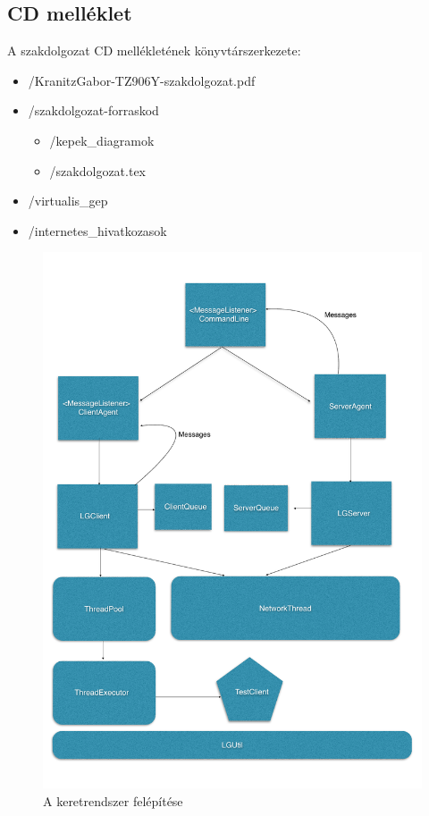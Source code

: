 \documentclass[a4paper,12pt,oneside]{report}
\begin{document}
\subsection{CD melléklet}
A szakdolgozat CD mellékletének könyvtárszerkezete:

\begin{itemize}
    \item[] /KranitzGabor-TZ906Y-szakdolgozat.pdf
    \item[] /szakdolgozat-forraskod
    \begin{itemize}
        \item[] /kepek\_diagramok
        \item[] /szakdolgozat.tex
    \end{itemize}
    
    \item[] /virtualis\_gep
    \item[] /internetes\_hivatkozasok

\end{itemize}

\begin{figure}[h]
  \includegraphics[width=1\textwidth]{load_generator.png}
  \caption{A keretrendszer felépítése }
  \label{fig:load_generator}
\end{figure}
\end{document}
